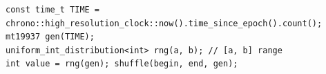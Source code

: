 \begin{verbatim}
const time_t TIME = chrono::high_resolution_clock::now().time_since_epoch().count();
mt19937 gen(TIME);
uniform_int_distribution<int> rng(a, b); // [a, b] range
int value = rng(gen); shuffle(begin, end, gen);
\end{verbatim}